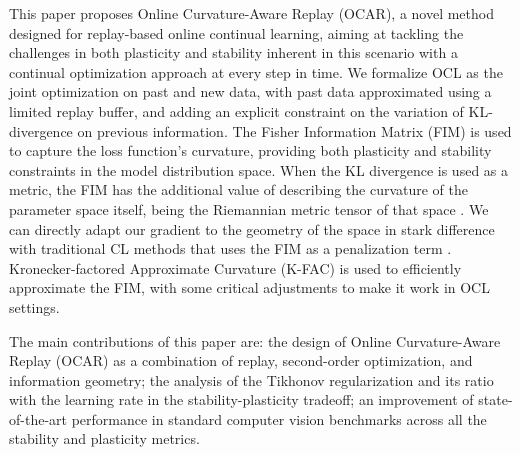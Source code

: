 This paper proposes Online Curvature-Aware Replay (OCAR), a novel method designed for replay-based online continual learning, aiming at tackling the challenges in both plasticity and stability inherent in this scenario with a continual optimization approach at every step in time.
We formalize OCL as the joint optimization on past and new data, with past data approximated using a limited replay buffer, and adding an explicit constraint on the variation of KL-divergence on previous information. The Fisher Information Matrix (FIM) is used to capture the loss function's curvature, providing both plasticity and stability constraints in the model distribution space.
When the KL divergence is used as a metric, the FIM has the additional value of describing the curvature of the parameter space itself, being the Riemannian metric tensor of that space \cite{amari2016information}. We can directly adapt our gradient to the geometry of the space in stark difference with traditional CL methods that uses the FIM as a penalization term \cite{kirkpatrick2017overcoming}. 
Kronecker-factored Approximate Curvature (K-FAC) \cite{martens2015optimizing} is used to efficiently approximate the FIM, with some critical adjustments to make it work in OCL settings.

The main contributions of this paper are: the design of Online Curvature-Aware Replay (OCAR) as a combination of replay, second-order optimization, and information geometry; the analysis of the Tikhonov regularization and its ratio with the learning rate in the stability-plasticity tradeoff; an improvement of state-of-the-art performance in standard computer vision benchmarks across all the stability and plasticity metrics.

